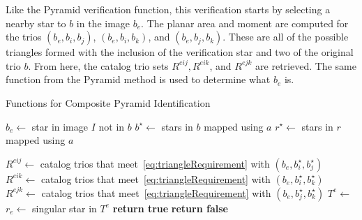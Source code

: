 Like the Pyramid verification function, this verification starts by selecting a nearby star to $b$ in the image $b_e$.
The planar area and moment are computed for the trios $(b_e, b_i, b_j)$, $(b_e, b_i, b_k)$, and $(b_e, b_j, b_k)$.
These are all of the possible triangles formed with the inclusion of the verification star and two of the original
trio $b$.
From here, the catalog trio sets $R^{eij}, R^{eik}$, and $R^{ejk}$ are retrieved.
The same function  from the Pyramid method is used to determine what $b_e$ is.
\begin{algorithm}
    \caption{Functions for Composite Pyramid Identification} \label{algorithm:compositePyramidHelpers}
    \begin{algorithmic}[1]
        \State $b_e \gets $ star in image $I$ not in $b$
        \State $b^{\star} \gets $ stars in $b$ mapped using $a$
        \State $r^{\star} \gets $ stars in $r$ mapped using $a$

        \State $R^{eij} \gets $ catalog trios that meet~\eqref{eq:triangleRequirement} with $(b_e, b^{\star}_i,
        b^{\star}_j)$
        \State $R^{eik} \gets $ catalog trios that meet~\eqref{eq:triangleRequirement} with $(b_e, b^{\star}_i,
        b^{\star}_k)$
        \State $R^{ejk} \gets $ catalog trios that meet~\eqref{eq:triangleRequirement} with $(b_e, b^{\star}_j,
        b^{\star}_k)$
        \State $T^e \gets $ 
        \\
        \State $r_e \gets $ singular star in $T^e$
        \State \textbf{return true}
        \EndIf
        \EndIf
        \State \textbf{return false}
        \EndFunction
    \end{algorithmic}
\end{algorithm}

\begin{table*}[ht]
\end{table*}

